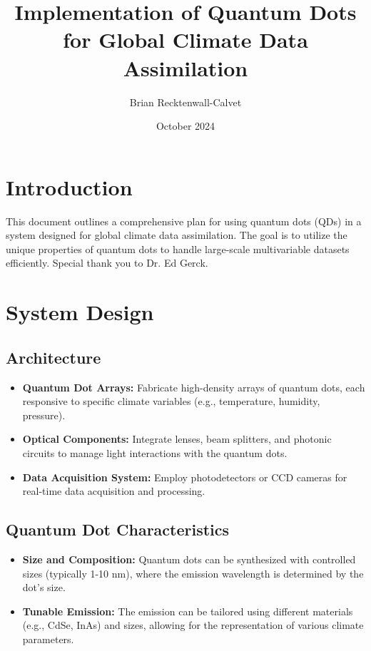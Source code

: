 \documentclass{article}
\title{Implementation of Quantum Dots for Global Climate Data Assimilation}
\author{Brian Recktenwall-Calvet}
\date{October 2024}
\begin{document}
\maketitle

\section{Introduction}
This document outlines a comprehensive plan for using quantum dots (QDs) in a system designed for global climate data assimilation. The goal is to utilize the unique properties of quantum dots to handle large-scale multivariable datasets efficiently. Special thank you to Dr. Ed Gerck.

\section{System Design}

\subsection{Architecture}

\begin{itemize}
    \item \textbf{Quantum Dot Arrays:} Fabricate high-density arrays of quantum dots, each responsive to specific climate variables (e.g., temperature, humidity, pressure).
    \item \textbf{Optical Components:} Integrate lenses, beam splitters, and photonic circuits to manage light interactions with the quantum dots.
    \item \textbf{Data Acquisition System:} Employ photodetectors or CCD cameras for real-time data acquisition and processing.
\end{itemize}

\subsection{Quantum Dot Characteristics}
\begin{itemize}
    \item \textbf{Size and Composition:} Quantum dots can be synthesized with controlled sizes (typically 1-10 nm), where the emission wavelength is determined by the dot's size.
    \item \textbf{Tunable Emission:} The emission can be tailored using different materials (e.g., CdSe, InAs) and sizes, allowing for the representation of various climate parameters.
\end{itemize}
\end{document}
